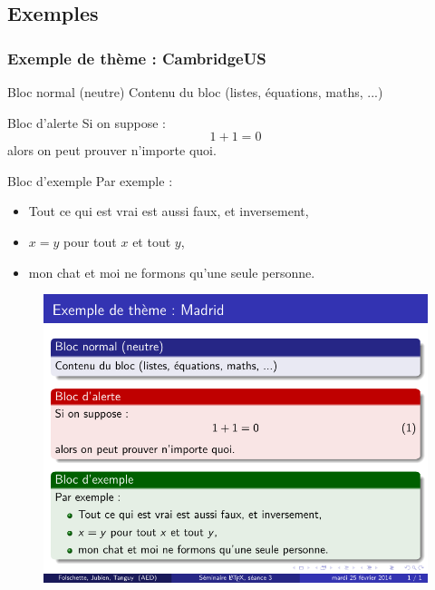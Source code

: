 \subsection{Exemples}

\begin{frame}[fragile]
  \frametitle{Exemple de thème : CambridgeUS}

\begin{block}{Bloc normal (neutre)}
  Contenu du bloc (listes, équations, maths, ...)
\end{block}

\begin{alertblock}{Bloc d'alerte}
  Si on suppose :
  \begin{equation}
    1+1=0
  \end{equation}
  alors on peut prouver n'importe quoi.
\end{alertblock}

\begin{exampleblock}{Bloc d'exemple}
  Par exemple :
  \begin{itemize}
    \item Tout ce qui est vrai est aussi faux, et inversement,
    \item $x = y$ pour tout $x$ et tout $y$,
    \item mon chat et moi ne formons qu'une seule personne.
  \end{itemize}
\end{exampleblock}
\end{frame}



\begin{frame}[plain]
\begin{figure}
  \centering
  \includegraphics[width=1\textwidth]{img/seance3_extheme_madrid}
\end{figure}
\end{frame}



